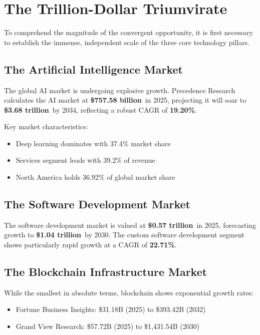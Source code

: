 \documentclass[11pt,a4paper]{report}
\newcommand{\marketvalue}[2]{\textcolor{accentgreen}{\textbf{\$#1}}\,\textcolor{darkgray}{#2}}
\newcommand{\cagr}[1]{\textcolor{primaryblue}{\textbf{#1\%}}}
\begin{document}
\chapter{The Trillion-Dollar Triumvirate}

To comprehend the magnitude of the convergent opportunity, it is first necessary to establish the immense, independent scale of the three core technology pillars.

\section{The Artificial Intelligence Market}

The global AI market is undergoing explosive growth. Precedence Research calculates the AI market at \marketvalue{757.58 billion}{} in 2025, projecting it will soar to \marketvalue{3.68 trillion}{} by 2034, reflecting a robust CAGR of \cagr{19.20}.

Key market characteristics:
\begin{itemize}
    \item Deep learning dominates with 37.4\% market share
    \item Services segment leads with 39.2\% of revenue
    \item North America holds 36.92\% of global market share
\end{itemize}

\section{The Software Development Market}

The software development market is valued at \marketvalue{0.57 trillion}{} in 2025, forecasting growth to \marketvalue{1.04 trillion}{} by 2030. The custom software development segment shows particularly rapid growth at a CAGR of \cagr{22.71}.

\section{The Blockchain Infrastructure Market}

While the smallest in absolute terms, blockchain shows exponential growth rates:
\begin{itemize}
    \item Fortune Business Insights: \$31.18B (2025) to \$393.42B (2032)
    \item Grand View Research: \$57.72B (2025) to \$1,431.54B (2030)
\end{itemize}
\end{document}
